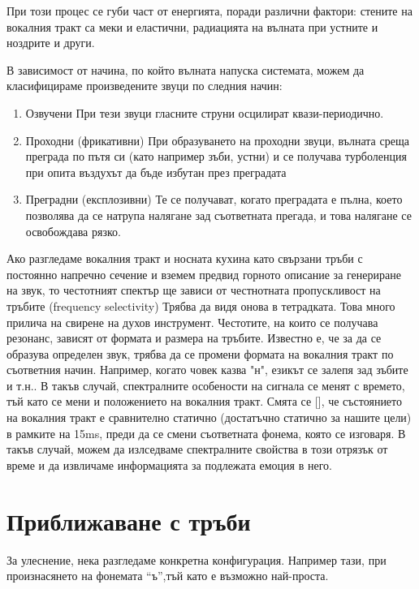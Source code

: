 \documentclass[12pt]{report}
\numberwithin{equation}{section}
\numberwithin{figure}{section}
\begin{document}
    При този процес се губи част от енергията, поради различни фактори: стените на вокалния тракт са меки и еластични, радиацията на вълната при устните и ноздрите и други.

    В зависимост от начина, по който вълната напуска системата, можем да класифицираме произведените звуци по следния начин:

    \begin{enumerate}
        \item Озвучени 
        При тези звуци гласните струни осцилират квази-периодично.
        \item Проходни (фрикативни) 
        При образуването на проходни звуци, вълната среща преграда по пътя си
            (като например зъби, устни) и се получава турболенция при опита въздухът да бъде избутан през преградата
        \item Преградни (експлозивни)
        Те се получават, когато преградата е пълна, което позволява да се натрупа налягане
        зад съответната прегада, и това налягане се освобождава рязко.
    \end{enumerate}
    
    Ако разгледаме вокалния тракт и носната кухина като свързани тръби с постоянно напречно сечение и вземем предвид горното описание за генериране на звук,
    то честотният спектър ще зависи от честнотната пропускливост на тръбите (frequency selectivity) Трябва да видя онова в тетрадката. Това много прилича на свирене на духов инструмент.
    Честотите, на които се получава резонанс, зависят от формата и размера на тръбите. Известно е, че за да се образува определен звук, трябва да се промени формата на вокалния тракт по 
    съответния начин. Например, когато човек казва "н", езикът се залепя зад зъбите и т.н.. В такъв случай, спектралните особености на сигнала се менят с времето, тъй като се мени и
    положението на вокалния тракт. Смята се [], че състоянието на вокалния тракт е сравнително статично (достатъчно статично за нашите цели) в рамките на 15ms, преди да се смени съответната
    фонема, която се изговаря. В такъв случай, можем да излседваме спектралните свойства в този отрязък от време и да извличаме информацията за подлежата емоция в него. 

    \section{Приближаване с тръби}
    За улеснение, нека разгледаме конкретна конфигурация. Например тази, при произнасянето на фонемата ``ъ'',тъй като е възможно най-проста.
    
\end{document}
